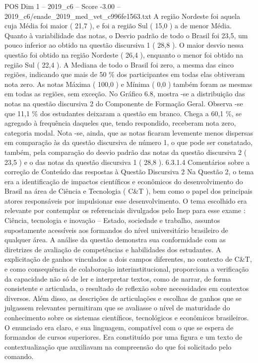 \begin{textsample}{POS Dim 1 – 2019\_c6 – Score -3.00 – 2019\_c6/enade\_2019\_med\_vet\_c996fe1563.txt}
A região Nordeste foi aquela cuja Média foi maior ( 21,7 ), e foi a região Sul ( 15,0 ) a de menor Média.
Quanto à variabilidade das notas, o Desvio padrão de todo o Brasil foi 23,5, um pouco inferior ao obtido na questão discursiva 1 ( 28,8 ).
O maior desvio nessa questão foi obtido na região Nordeste ( 26,4 ), enquanto o menor foi obtido na região Sul ( 22,4 ).
A Mediana de todo o Brasil foi zero, a mesma das cinco regiões, indicando que mais de 50 \% dos participantes em todas elas obtiveram nota zero.
As notas Máxima ( 100,0 ) e Mínima ( 0,0 ) também foram as mesmas em todas as regiões, sem exceção.
No Gráfico 6.8, mostra -se a distribuição das notas na questão discursiva 2 do Componente de Formação Geral.
Observa -se que 11,1 \% dos estudantes deixaram a questão em branco.
Chega a 60,1 \%, se agregado à frequência daqueles que, tendo respondido, receberam nota zero, categoria modal.
Nota -se, ainda, que as notas ficaram levemente menos dispersas em comparação às da questão discursiva de número 1, o que pode ser constatado, também, pela comparação do desvio padrão das notas da questão discursiva 2 ( 23,5 ) e o das notas da questão discursiva 1 ( 28,8 ). 6.3.1.4 Comentários sobre a correção de Conteúdo das respostas à Questão Discursiva 2 Na Questão 2, o tema era a identificação de impactos científicos e econômicos do desenvolvimento do Brasil na área de Ciência e Tecnologia ( C\&T ), bem como o papel dos principais atores responsáveis por impulsionar esse desenvolvimento.
O tema escolhido era relevante por contemplar os referenciais divulgados pelo Inep para esse exame : Ciência, tecnologia e inovação – Estado, sociedade e trabalho, assuntos supostamente acessíveis aos formandos do nível universitário brasileiro de qualquer área.
A análise da questão demonstra sua conformidade com as diretrizes de avaliação de competências e habilidades dos estudantes.
A explicitação de ganhos vinculados a dois campos diferentes, no contexto de C\&T, e como consequência de colaboração interinstitucional, proporciona a verificação da capacidade não só de ler e interpretar textos, como de narrar, de forma consistente e articulada, o resultado de reflexão sobre necessidades em contextos diversos.
Além disso, as descrições de articulações e escolhas de ganhos que se julgassem relevantes permitiram que se avaliasse o nível de maturidade do conhecimento sobre os sistemas científicos, tecnológicos e econômicos brasileiros.
O enunciado era claro, e sua linguagem, compatível com o que se espera de formandos de cursos superiores.
Era constituído por uma figura e um texto de contextualização que auxiliavam na compreensão do que foi solicitado pelo comando.

\end{textsample}
